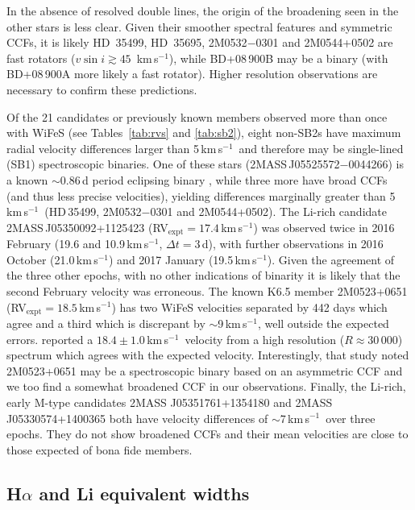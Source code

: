 \documentclass[usenatbib]{mnras}
\newcommand{\kms}{\textrm{km\,s$^{-1}$}}
\begin{document}
In the absence of resolved double lines, the origin of the broadening
seen in the other stars is less clear. Given their smoother
spectral features and symmetric CCFs, it is likely HD~35499, HD~35695,
2M0532$-$0301 and 2M0544+0502 are fast rotators ($v\sin i \gtrsim
45$~\kms), while BD+08\,900B may be a binary (with BD+08\,900A more
likely a fast rotator). Higher resolution observations are necessary
to confirm these predictions.

Of the 21 candidates or previously known members observed more than
once with WiFeS (see Tables~\ref{tab:rvs} and \ref{tab:sb2}), eight non-SB2s have maximum radial
velocity differences larger than 5\,\kms\ and therefore may be single-lined (SB1) 
spectroscopic binaries. One of these stars (2MASS\,J05525572$-$0044266) is
a known $\sim$0.86\,d period eclipsing binary \citep[][see
  Section~\ref{2massj0552-0044}]{Drake14}, while three more have broad CCFs
(and thus less precise velocities), yielding differences marginally
greater than 5\,\kms\ (HD\,35499, 2M0532$-$0301 and 2M0544+0502). The
Li-rich candidate 2MASS\,J05350092+1125423 (RV$_\textrm{expt}=
17.4$\,\kms) was observed twice in 2016 February (19.6 and 10.9\,\kms,
$\Delta t=3$\,d), with further observations in 2016 October
(21.0\,\kms) and 2017 January (19.5\,\kms). Given the agreement of the three other epochs, with
no other indications of binarity it is likely that the second February velocity was erroneous.
The known K6.5 member 2M0523+0651 (RV$_\textrm{expt}= 18.5$\,\kms) has two
WiFeS velocities separated by 442 days which agree and a third which is discrepant by
$\sim$9\,\kms, well outside the expected errors. \citet{Alcala00} reported a $18.4\pm1.0$\,\kms\
velocity from a high resolution ($R\approx30\,000$) spectrum which agrees with the expected
velocity. Interestingly, that study noted 2M0523+0651 may be a spectroscopic binary based on
an asymmetric CCF and we too find a somewhat broadened CCF in our observations. Finally, the Li-rich, early M-type candidates 2MASS J05351761+1354180 and 2MASS J05330574+1400365 both have velocity differences of $\sim$7\,\kms\ over three epochs. They do not show broadened CCFs and their mean velocities are close to those expected of bona fide members.

\subsection{H$\alpha$ and Li equivalent widths}
\label{ha_li_equivalent_widths}
\end{document}
